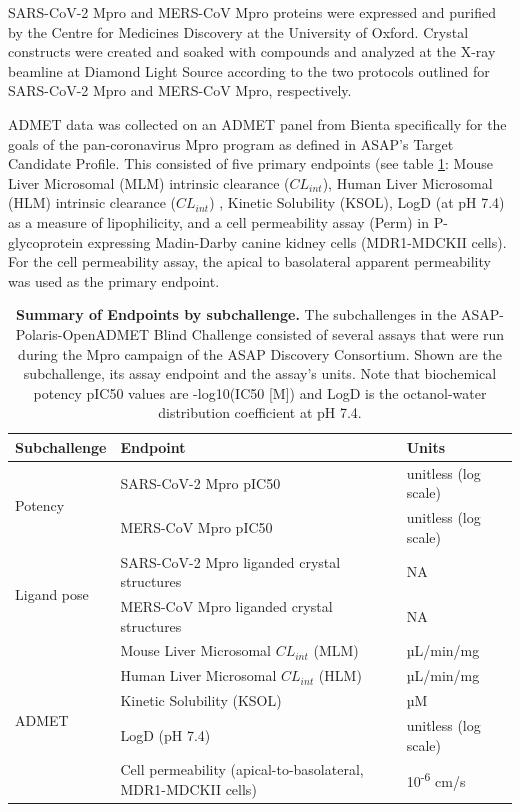 \documentclass[journal=jcim,manuscript=article]{achemso}
\begin{document}
SARS-CoV-2 Mpro and MERS-CoV Mpro proteins were expressed and purified by the Centre for Medicines Discovery at the University of Oxford.\cite{wang_2025_mers, wang_2025_sars2} Crystal constructs were created and soaked with compounds and analyzed at the X-ray beamline at Diamond Light Source according to the two protocols outlined for SARS-CoV-2 Mpro\cite{sars_mpro_crystal_protocol} and MERS-CoV Mpro, respectively\cite{mers_mpro_crystal_protocol}. 

ADMET data was collected on an ADMET panel from Bienta specifically for the goals of the pan-coronavirus Mpro program as defined in ASAP’s Target Candidate Profile\cite{sars_mers_tcp}. This consisted of five primary endpoints (see table \ref{table_challenge_endpoints}: Mouse Liver Microsomal (MLM) intrinsic clearance ($CL_{int}$), Human Liver Microsomal (HLM) intrinsic clearance ($CL_{int}$) \cite{hlm_mlm_assay_protcol}, Kinetic Solubility (KSOL)\cite{ksol_assay_protocol}, LogD (at pH 7.4) as a measure of lipophilicity\cite{logD_assay_protocol}, and a cell permeability assay (Perm) in P-glycoprotein expressing Madin-Darby canine kidney cells (MDR1-MDCKII cells)\cite{perm_assay_protocol}. For the cell permeability assay, the apical to basolateral apparent permeability was used as the primary endpoint.

\begin{table}[ht]
\centering
\caption{\textbf{Summary of Endpoints by subchallenge.} The subchallenges in the ASAP-Polaris-OpenADMET Blind Challenge consisted of several assays that were run during the Mpro campaign of the ASAP Discovery Consortium. Shown are the subchallenge, its assay endpoint and the assay's units. Note that biochemical potency pIC50 values are -log10(IC50 [M]) and LogD is the octanol-water distribution coefficient at pH 7.4.}
\begin{tabular}{|l|l|l|}
\hline
\textbf{Subchallenge} & \textbf{Endpoint} & \textbf{Units} \\
\hline
\multirow{2}{*}{Potency} 
& SARS-CoV-2 Mpro pIC50 & unitless (log scale) \\
& MERS-CoV Mpro pIC50    & unitless (log scale) \\
\hline
\multirow{2}{*}{Ligand pose} 
& SARS-CoV-2 Mpro liganded crystal structures & NA \\
& MERS-CoV Mpro liganded crystal structures   & NA \\
\hline
\multirow{5}{*}{ADMET} 
& Mouse Liver Microsomal $CL_{int}$ (MLM)  & µL/min/mg \\
& Human Liver Microsomal $CL_{int}$ (HLM)  & µL/min/mg \\
& Kinetic Solubility (KSOL)               & µM \\
& LogD (pH 7.4)                                    & unitless (log scale) \\
& Cell permeability (apical-to-basolateral, MDR1-MDCKII cells) & 10\textsuperscript{-6} cm/s \\
\hline
\end{tabular}
\label{table_challenge_endpoints}
\end{table}
\end{document}
